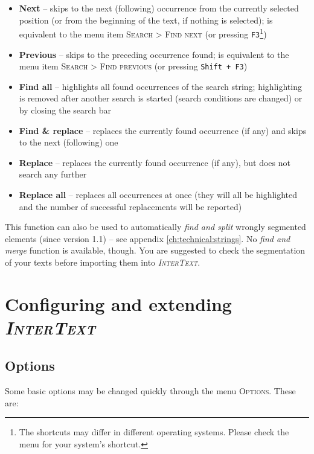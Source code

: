 \documentclass[a4paper,10pt,oneside]{book}
\newcommand{\IT}{\textit{\textsc{InterText}}\xspace}
\newcommand{\keys}[1]{\texttt{#1}}
\newcommand{\menu}[1]{\textsc{#1}}
\begin{document}
\begin{itemize}
 \item \textbf{Next} -- skips to the next (following) occurrence from the currently selected position (or from the beginning of the text, if nothing is selected); is equivalent to the menu item \menu{Search} > \menu{Find next} (or pressing \keys{F3}\footnote{The shortcuts may differ in different operating systems. Please check the menu for your system's shortcut.})
 \item \textbf{Previous} -- skips to the preceding occurrence found; is equivalent to the menu item \menu{Search} > \menu{Find previous} (or pressing \keys{Shift + F3})
 \item \textbf{Find all} -- highlights all found occurrences of the search string; highlighting is removed after another search is started (search conditions are changed) or by closing the search bar
 \item \textbf{Find \& replace} -- replaces the currently found occurrence (if any) and skips to the next (following) one
 \item \textbf{Replace} -- replaces the currently found occurrence (if any), but does not search any further
 \item \textbf{Replace all} -- replaces all occurrences at once (they will all be highlighted and the number of successful replacements will be reported)
\end{itemize}

This function can also be used to automatically \emph{find and split} wrongly segmented elements (since version 1.1) -- see appendix \ref{ch:technical:strings}. No \emph{find and merge} function is available, though. You are suggested to check the segmentation of your texts before importing them into \IT.

\chapter{Configuring and extending \IT}\label{ch:detail:config}

\section{Options}\label{ch:detail:config:options}

Some basic options may be changed quickly through the menu \menu{Options}. These are:
\end{document}

